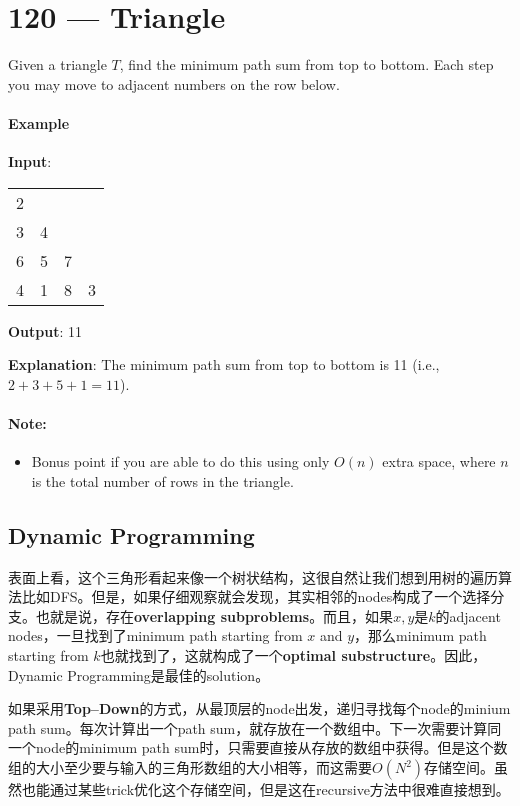 \section{120 --- Triangle}
Given a triangle $T$, find the minimum path sum from top to bottom. Each step you may move to adjacent numbers on the row below.
\paragraph{Example}
\begin{flushleft}
\textbf{Input}:
\begin{table}[H]
\begin{tabular}{llll}
2 &   &   &   \\
3 & 4 &   &   \\
6 & 5 & 7 &   \\
4 & 1 & 8 & 3
\end{tabular}
\end{table}
\textbf{Output}: 11

\textbf{Explanation}:
The minimum path sum from top to bottom is 11 (i.e., $2 + 3 + 5 + 1 = 11$).
\end{flushleft}
\paragraph{Note:}
\begin{itemize}
\item Bonus point if you are able to do this using only $O(n)$ extra space, where $n$ is the total number of rows in the triangle.
\end{itemize}
\subsection{Dynamic Programming}

表面上看，这个三角形看起来像一个树状结构，这很自然让我们想到用树的遍历算法比如DFS。但是，如果仔细观察就会发现，其实相邻的nodes构成了一个选择分支。也就是说，存在\textbf{overlapping subproblems}。而且，如果$x, y$是$k$的adjacent nodes，一旦找到了minimum path starting from $x$ and $y$，那么minimum path starting from $k$也就找到了，这就构成了一个\textbf{optimal substructure}。因此，Dynamic Programming是最佳的solution。



如果采用\textbf{Top--Down}的方式，从最顶层的node出发，递归寻找每个node的minium path sum。每次计算出一个path sum，就存放在一个数组中。下一次需要计算同一个node的minimum path sum时，只需要直接从存放的数组中获得。但是这个数组的大小至少要与输入的三角形数组的大小相等，而这需要$O(N^2)$存储空间。虽然也能通过某些trick优化这个存储空间，但是这在recursive方法中很难直接想到。


